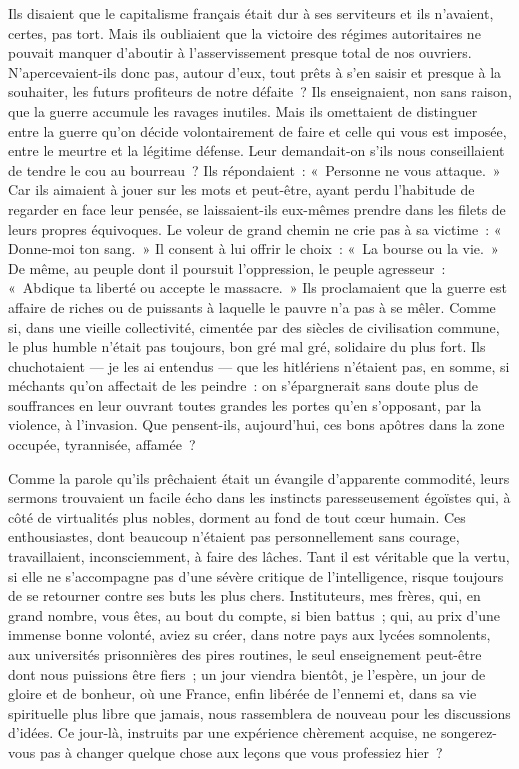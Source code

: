 \documentclass[french,twoside]{book} %
\begin{document}
Ils disaient que le capitalisme français était dur à ses serviteurs et ils n’avaient, certes, pas tort. Mais ils oubliaient que la victoire des régimes autoritaires ne pouvait manquer d’aboutir à l’asservissement presque total de nos ouvriers. N’apercevaient-ils donc pas, autour d’eux, tout prêts à s’en saisir et presque à la souhaiter, les futurs profiteurs de notre défaite ? Ils enseignaient, non sans raison, que la guerre accumule les ravages inutiles. Mais ils omettaient de distinguer entre la guerre qu’on décide volontairement de faire et celle qui vous est imposée, entre le meurtre et la légitime défense. Leur demandait-on s’ils nous conseillaient de tendre le cou au bourreau ? Ils répondaient : « Personne ne vous attaque. » Car ils aimaient à jouer sur les mots et peut-être, ayant perdu l’habitude de regarder en face leur pensée, se laissaient-ils eux-mêmes prendre dans les filets de leurs propres équivoques. Le voleur de grand chemin ne crie pas à sa victime : «   Donne-moi ton sang. » Il consent à lui offrir le choix : « La bourse ou la vie. » De même, au peuple dont il poursuit l’oppression, le peuple agresseur : « Abdique ta liberté ou accepte le massacre. » Ils proclamaient que la guerre est affaire de riches ou de puissants à laquelle le pauvre n’a pas à se mêler. Comme si, dans une vieille collectivité, cimentée par des siècles de civilisation commune, le plus humble n’était pas toujours, bon gré mal gré, solidaire du plus fort. Ils chuchotaient — je les ai entendus — que les hitlériens n’étaient pas, en somme, si méchants qu’on affectait de les peindre : on s’épargnerait sans doute plus de souffrances en leur ouvrant toutes grandes les portes qu’en s’opposant, par la violence, à l’invasion. Que pensent-ils, aujourd’hui, ces bons apôtres dans la zone occupée, tyrannisée, affamée ?\par
Comme la parole qu’ils prêchaient était un évangile d’apparente commodité, leurs sermons trouvaient un facile écho dans les instincts paresseusement égoïstes qui, à côté de virtualités plus nobles, dorment au fond de tout cœur humain. Ces enthousiastes, dont beaucoup n’étaient pas personnellement sans courage, travaillaient, inconsciemment, à faire des lâches. Tant il est véritable que la vertu, si elle ne s’accompagne pas d’une sévère critique de l’intelligence, risque toujours de se retourner contre ses buts les plus chers. Instituteurs, mes frères, qui, en grand nombre, vous êtes, au bout du compte, si bien battus ; qui, au prix d’une immense bonne volonté, aviez su créer, dans notre pays aux lycées somnolents, aux universités prisonnières des pires routines, le seul enseignement peut-être dont nous puissions être fiers ; un jour viendra bientôt, je l’espère, un jour de gloire et de bonheur, où une France, enfin libérée de l’ennemi et, dans sa vie spirituelle plus libre que jamais, nous rassemblera de nouveau pour les discussions d’idées. Ce jour-là, instruits par une   expérience chèrement acquise, ne songerez-vous pas à changer quelque chose aux leçons que vous professiez hier ?\par
\end{document}
